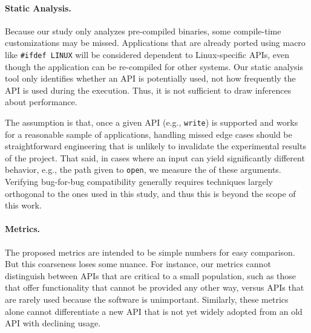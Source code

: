 \paragraph{Static Analysis.}
Because our study only analyzes pre-compiled binaries, some compile-time customizations may be missed.
Applications that are already ported using macro like {\tt \#ifdef LINUX} will be considered dependent to Linux-specific APIs,
even though the application can be re-compiled for other systems.
Our static analysis tool only identifies 
whether an API is potentially used,
not how frequently the API is used during the execution.
Thus, it is not sufficient to draw inferences about performance.



The assumption is that, once a given API (e.g., {\tt write}) is supported and works for a reasonable sample of applications,
handling missed edge cases should be straightforward engineering that is unlikely to invalidate the experimental results of the project.
That said, in cases where an input can yield significantly different behavior, e.g.,
the path given to {\tt open},
we measure the \usagemetric{} of these arguments.
Verifying bug-for-bug compatibility generally requires techniques largely orthogonal to the ones used in this study,
and thus this is beyond the scope of this work.





\paragraph{Metrics.}
The proposed metrics are intended to be simple numbers for easy comparison.
But this coarseness loses some nuance. 
For instance, our metrics cannot distinguish between
APIs that are critical to a small population, such as those that offer 
functionality that cannot be provided any other way, 
versus APIs that are rarely used because the software is unimportant.
Similarly, these metrics alone cannot differentiate a new API 
that is not yet widely adopted from an old API with declining usage.


